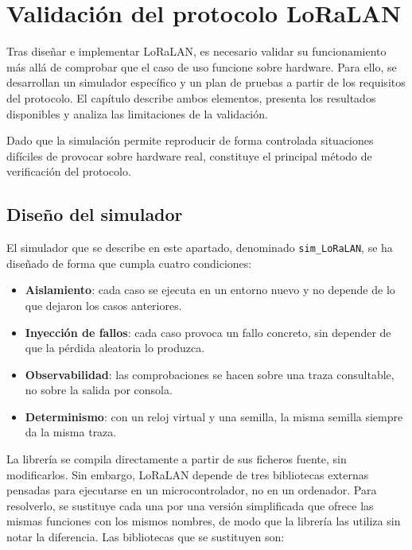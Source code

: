 \chapter{Validación del protocolo LoRaLAN}\label{chap:6}

Tras diseñar e implementar LoRaLAN, es necesario validar su funcionamiento más allá de comprobar que el caso de uso funcione sobre hardware. Para ello, se desarrollan un simulador específico y un plan de pruebas a partir de los requisitos del protocolo. El capítulo describe ambos elementos, presenta los resultados disponibles y analiza las limitaciones de la validación.

Dado que la simulación permite reproducir de forma controlada situaciones difíciles de provocar sobre hardware real, constituye el principal método de verificación del protocolo.  


\section{Diseño del simulador}\label{sec:disenosim}

El simulador que se describe en este apartado, denominado \texttt{sim\_LoRaLAN}, se ha diseñado de forma que cumpla cuatro condiciones:

\begin{itemize}
\item \textbf{Aislamiento}: cada caso se ejecuta en un entorno nuevo y no depende de lo que dejaron los casos anteriores.
\item \textbf{Inyección de fallos}: cada caso provoca un fallo concreto, sin depender de que la pérdida aleatoria lo produzca.
\item \textbf{Observabilidad}: las comprobaciones se hacen sobre una traza consultable, no sobre la salida por consola.
\item \textbf{Determinismo}: con un reloj virtual y una semilla, la misma semilla siempre da la misma traza.
\end{itemize}

La librería se compila directamente a partir de sus ficheros fuente, sin modificarlos. Sin embargo, LoRaLAN depende de tres bibliotecas externas pensadas para ejecutarse en un microcontrolador, no en un ordenador. Para resolverlo, se sustituye cada una por una versión simplificada que ofrece las mismas funciones con los mismos nombres, de modo que la librería las utiliza sin notar la diferencia. Las bibliotecas que se sustituyen son:

